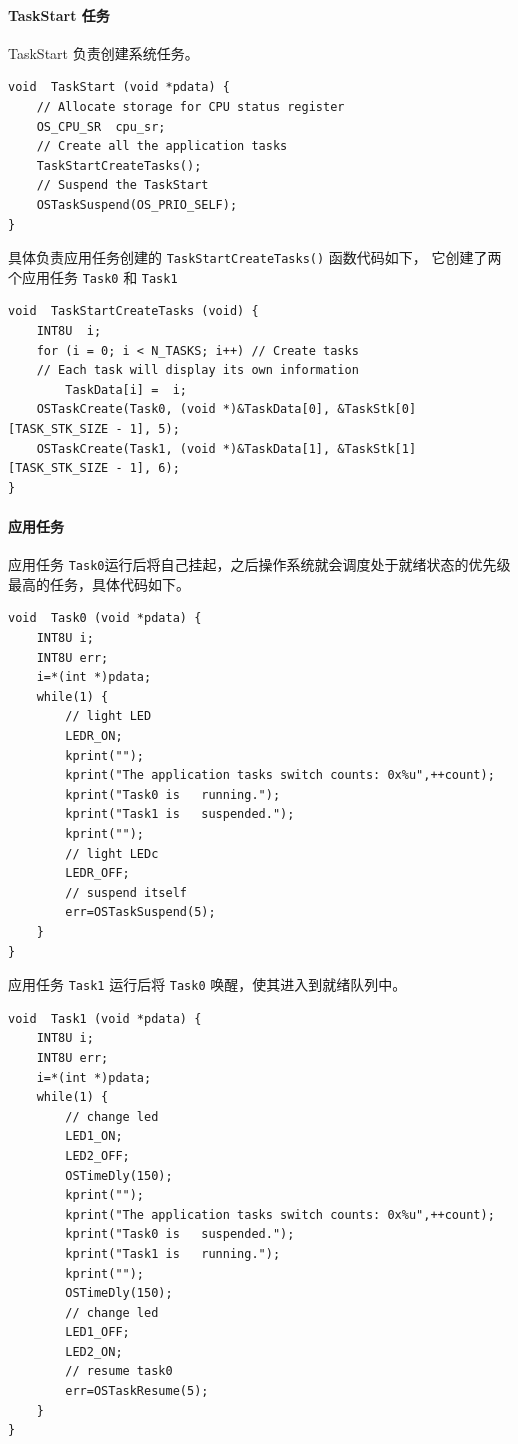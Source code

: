 \documentclass{ctexart}
\begin{document}
    \paragraph{TaskStart 任务}
    TaskStart 负责创建系统任务。
    \begin{lstlisting}
void  TaskStart (void *pdata) {
    // Allocate storage for CPU status register
    OS_CPU_SR  cpu_sr;
    // Create all the application tasks
    TaskStartCreateTasks();
    // Suspend the TaskStart
    OSTaskSuspend(OS_PRIO_SELF);
}
    \end{lstlisting}
    具体负责应用任务创建的 \lstinline|TaskStartCreateTasks()| 函数代码如下，
    它创建了两个应用任务 \verb|Task0| 和 \verb|Task1|
    \begin{lstlisting}
void  TaskStartCreateTasks (void) {
    INT8U  i;
    for (i = 0; i < N_TASKS; i++) // Create tasks
    // Each task will display its own information
        TaskData[i] =  i;
    OSTaskCreate(Task0, (void *)&TaskData[0], &TaskStk[0][TASK_STK_SIZE - 1], 5);
    OSTaskCreate(Task1, (void *)&TaskData[1], &TaskStk[1][TASK_STK_SIZE - 1], 6);
}
    \end{lstlisting}
    
    \paragraph{应用任务}
    应用任务 \verb|Task0|运行后将自己挂起，之后操作系统就会调度处于就绪状态的优先级最高的任务，具体代码如下。
    \begin{lstlisting}
void  Task0 (void *pdata) {
    INT8U i;
    INT8U err;
    i=*(int *)pdata;
    while(1) {
        // light LED
        LEDR_ON;
        kprint("");
        kprint("The application tasks switch counts: 0x%u",++count);
        kprint("Task0 is   running.");
        kprint("Task1 is   suspended.");
        kprint("");
        // light LEDc
        LEDR_OFF;
        // suspend itself 
        err=OSTaskSuspend(5);
    }
}
    \end{lstlisting}
    应用任务 \verb|Task1| 运行后将 \verb|Task0| 唤醒，使其进入到就绪队列中。
    \begin{lstlisting}
void  Task1 (void *pdata) {
    INT8U i;
    INT8U err;
    i=*(int *)pdata;
    while(1) {
        // change led
        LED1_ON;
        LED2_OFF;
        OSTimeDly(150);
        kprint("");
        kprint("The application tasks switch counts: 0x%u",++count);
        kprint("Task0 is   suspended.");
        kprint("Task1 is   running.");
        kprint("");
        OSTimeDly(150);
        // change led
        LED1_OFF;
        LED2_ON;
        // resume task0 
        err=OSTaskResume(5);
    }
}
    \end{lstlisting}
    
\end{document}
